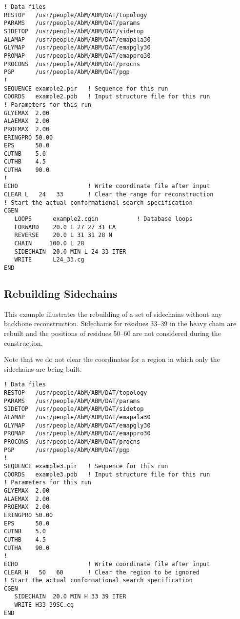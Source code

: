 \documentclass{report}
\begin{document}
\begin{verbatim}
! Data files
RESTOP   /usr/people/AbM/ABM/DAT/topology
PARAMS   /usr/people/AbM/ABM/DAT/params
SIDETOP  /usr/people/AbM/ABM/DAT/sidetop
ALAMAP   /usr/people/AbM/ABM/DAT/emapala30
GLYMAP   /usr/people/AbM/ABM/DAT/emapgly30
PROMAP   /usr/people/AbM/ABM/DAT/emappro30
PROCONS  /usr/people/AbM/ABM/DAT/procns
PGP      /usr/people/AbM/ABM/DAT/pgp
!
SEQUENCE example2.pir   ! Sequence for this run
COORDS   example2.pdb   ! Input structure file for this run
! Parameters for this run
GLYEMAX  2.00
ALAEMAX  2.00
PROEMAX  2.00
ERINGPRO 50.00
EPS      50.0
CUTNB    5.0
CUTHB    4.5
CUTHA    90.0
!
ECHO                    ! Write coordinate file after input
CLEAR L   24   33       ! Clear the range for reconstruction
! Start the actual conformational search specification
CGEN
   LOOPS      example2.cgin           ! Database loops
   FORWARD    20.0 L 27 27 31 CA
   REVERSE    20.0 L 31 31 28 N
   CHAIN     100.0 L 28
   SIDECHAIN  20.0 MIN L 24 33 ITER
   WRITE      L24_33.cg
END
\end{verbatim}






\subsection{Rebuilding Sidechains}
This example illustrates the rebuilding of a set of sidechains
without any backbone reconstruction. Sidechains for residues 33--39
in the heavy chain are rebuilt and the positions of residues 50--60
are not considered during the construction.

Note that we do not clear the coordinates for a region in which 
only the sidechains are being built.

\begin{verbatim}
! Data files
RESTOP   /usr/people/AbM/ABM/DAT/topology
PARAMS   /usr/people/AbM/ABM/DAT/params
SIDETOP  /usr/people/AbM/ABM/DAT/sidetop
ALAMAP   /usr/people/AbM/ABM/DAT/emapala30
GLYMAP   /usr/people/AbM/ABM/DAT/emapgly30
PROMAP   /usr/people/AbM/ABM/DAT/emappro30
PROCONS  /usr/people/AbM/ABM/DAT/procns
PGP      /usr/people/AbM/ABM/DAT/pgp
!
SEQUENCE example3.pir   ! Sequence for this run
COORDS   example3.pdb   ! Input structure file for this run
! Parameters for this run
GLYEMAX  2.00
ALAEMAX  2.00
PROEMAX  2.00
ERINGPRO 50.00
EPS      50.0
CUTNB    5.0
CUTHB    4.5
CUTHA    90.0
!
ECHO                    ! Write coordinate file after input
CLEAR H   50   60       ! Clear the region to be ignored
! Start the actual conformational search specification
CGEN
   SIDECHAIN  20.0 MIN H 33 39 ITER
   WRITE H33_39SC.cg
END
\end{verbatim}
\end{document}

